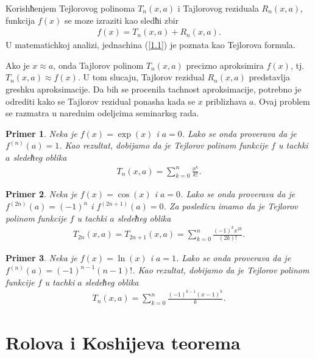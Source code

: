 \documentclass[12pt,a4paper]{article}
\newtheorem{pri}{Primer}[section]
\begin{document}
Korishћenjem Tejlorovog polinoma $T_{n}(x,a)$ i 
Tajlorovog reziduala $R_{n}(x,a)$, 
funkcija $f(x)$ se moze izraziti kao sledћi zbir 
\begin{align}\label{1.1}
    f(x)=T_{n}(x,a)+R_{n}(x,a). 
\end{align}
U matematichkoj analizi, jednachina (\ref{1.1}) je poznata 
kao Tejlorova formula. 

Ako je $x\approx a$, onda Tajlorov polinom $T_{n}(x,a)$ 
precizno aproksimira $f(x)$, tj. $T_{n}(x,a)\approx f(x)$. 
U tom slucaju, Tajlorov rezidual $R_{n}(x,a)$ predstavlja 
greshku aproksimacije. 
Da bih se procenila tachnost aproksimacije, 
potrebno je odrediti kako se Tajlorov rezidual 
ponasha kada se $x$ priblizhava $a$. 
Ovaj problem se 
razmatra u narednim odeljcima seminarksg rada. 

\begin{pri}
Neka je $f(x)=\exp(x)$ i $a=0$. 
Lako se onda proverava da je $f^{(n)}(a)=1$. 
Kao rezultat, dobijamo da je Tejlorov polinom %
funkcije 
$f$ u tachki $a$ sledeћeg oblika
\begin{align*}
    T_{n}(x,a)
    =
    \sum_{k=0}^{n}\frac{x^{k}}{k!}. 
\end{align*}
\end{pri}

\begin{pri}
Neka je $f(x)=\cos(x)$ i $a=0$. 
Lako se onda proverava da je $f^{(2n)}(a)=(-1)^{n}$
i $f^{(2n+1)}(a)=0$. 
Za posledicu imamo da je Tejlorov 
polinom %
funkcije $f$ u tachki $a$ sledeћeg oblika
\begin{align*}
    T_{2n}(x,a)
    =
    T_{2n+1}(x,a)
    =
    \sum_{k=0}^{n}\frac{(-1)^{k}x^{2k}}{(2k)!}. 
\end{align*}
\end{pri}

\begin{pri}
Neka je $f(x)=\ln(x)$ i $a=1$. 
Lako se onda proverava da je $f^{(n)}(a)=(-1)^{n-1}(n-1)!$. 
Kao rezultat, dobijamo da je Tejlorov polinom %
funkcije 
$f$ u tachki $a$ sledeћeg oblika
\begin{align*}
    T_{n}(x,a)
    =
    \sum_{k=0}^{n}\frac{(-1)^{k-1}(x-1)^{k}}{k}. 
\end{align*}
\end{pri}


\section{Rolova i Koshijeva teorema}
\end{document}
